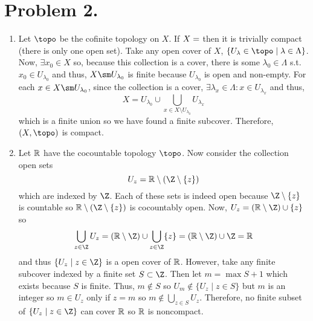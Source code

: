 \documentclass[12pt]{extarticle}
\begin{document}
\section*{Problem 2.}
\begin{enumerate}
\item Let $\topo$ be the cofinite topology on $X$. If $X = \empty$ then it is trivially compact (there is only one open set). Take any open cover of $X$, $\{U_\lambda \in \topo \mid \lambda \in \Lambda \}$. Now, $\exists x_0 \in X$ so, because this collection is a cover, there is some $\lambda_0 \in \Lambda$ s.t. $x_0 \in U_{\lambda_0}$ and thus, $X \sm U_{\lambda_0}$ is finite because $U_{\lambda_0}$ is open and non-empty. For each $x \in X \sm U_{\lambda_0}$, since the collection is a cover, $\exists \lambda_x \in \Lambda : x \in U_{\lambda_x}$ and thus, \[X = U_{\lambda_0} \cup \bigcup\limits_{x \in X \setminus U_{\lambda_0}} U_{\lambda_x}\] which is a finite union so we have found a finite subcover. Therefore, $(X, \topo)$ is compact.

\item Let $\mathbb{R}$ have the cocountable topology $\topo$. Now consider the collection open sets \[U_z = \R \setminus (\Z \setminus \{z\})\] which are indexed by $\Z$. Each of these sets is indeed open because $\Z \setminus \{z\}$ is countable so $\R \setminus (\Z \setminus \{z\})$ is cocountably open. Now, $U_z = (\R \setminus \Z) \cup \{z\}$ so \[ \bigcup\limits_{z \in \Z} U_z =  (\R \setminus \Z) \cup \bigcup\limits_{z \in \Z} \{z\} = (\R \setminus \Z) \cup \Z = \R\]
and thus $\{U_z \mid z \in \Z\}$ is a open cover of $\mathbb{R}$. However, take any finite subcover indexed by a finite set $S \subset \Z$. Then let $m = \max{S} + 1$ which exists because $S$ is finite. Thus, $m \notin S$ so $U_m \notin \{U_z \mid z \in S\}$ but $m$ is an integer so $m \in U_z$ only if $z = m$ so $m \notin \bigcup\limits_{z \in S} U_z$. Therefore, no finite subset of $\{U_z \mid z \in \Z\}$ can cover $\mathbb{R}$ so $\mathbb{R}$ is noncompact.   
\end{enumerate}
\end{document}
